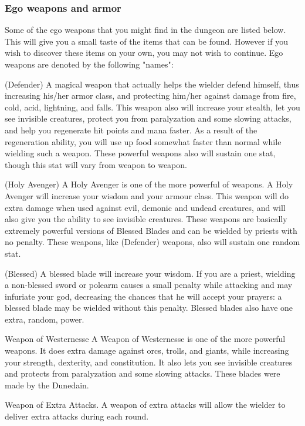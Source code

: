 \subsubsection{Ego weapons and armor}
Some of the ego weapons that you might find in the dungeon are listed below.
This will give you a small taste of the items that can be found. However if
you wish to discover these items on your own, you may not wish to continue.
Ego weapons are denoted by the following "names":

(Defender)
     A magical weapon that actually helps the wielder defend himself, thus
     increasing his/her armor class, and protecting him/her against damage
     from fire, cold, acid, lightning, and falls. This weapon also will
     increase your stealth, let you see invisible creatures, protect you
     from paralyzation and some slowing attacks, and help you regenerate hit
     points and mana faster. As a result of the regeneration ability, you
     will use up food somewhat faster than normal while wielding such a
     weapon. These powerful weapons also will sustain one stat, though this
     stat will vary from weapon to weapon.

(Holy Avenger)
     A Holy Avenger is one of the more powerful of weapons. A Holy Avenger
     will increase your wisdom and your armour class. This weapon will do
     extra damage when used against evil, demonic and undead creatures, and
     will also give you the ability to see invisible creatures. These
     weapons are basically extremely powerful versions of Blessed Blades
     and can be wielded by priests with no penalty. These weapons, like
     (Defender) weapons, also will sustain one random stat.

(Blessed)
     A blessed blade will increase your wisdom. If you are a priest,
     wielding a non-blessed sword or polearm causes a small penalty while
     attacking and may infuriate your god, decreasing the chances that he
     will accept your prayers: a blessed blade may be wielded without
     this penalty. Blessed blades also have one extra, random, power.

Weapon of Westernesse
     A Weapon of Westernesse is one of the more powerful weapons. It does
     extra damage against orcs, trolls, and giants, while increasing your
     strength, dexterity, and constitution. It also lets you see invisible
     creatures and protects from paralyzation and some slowing attacks.
     These blades were made by the Dunedain.

Weapon of Extra Attacks.
     A weapon of extra attacks will allow the wielder to deliver extra
     attacks during each round.

